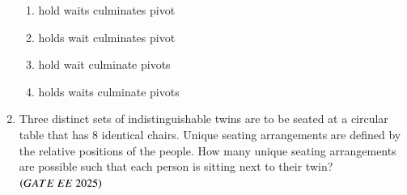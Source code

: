 \documentclass[journal,12pt,onecolumn]{IEEEtran}
\theoremstyle{remark}
\begin{document}
\begin{enumerate}
\begin{enumerate}
  \item {} hold \quad {} waits \quad {} culminates \quad {} pivot  \item {} holds \quad {} wait \quad {} culminates \quad {} pivot 
 \item {} hold \quad {} wait \quad {} culminate \quad {} pivots  
  \item {} holds \quad {} waits \quad {} culminate \quad {} pivots    \end{enumerate}
  \item Three distinct sets of indistinguishable twins are to be seated at a circular table that has 8 identical chairs. Unique seating arrangements are defined by the relative positions of the people.
How many unique seating arrangements are possible such that each person is sitting next to their twin?
\hfill $\brak{GATE\ EE\ 2025}$
   \begin{enumerate}
    \end{enumerate}


\end{enumerate}
\end{document}
